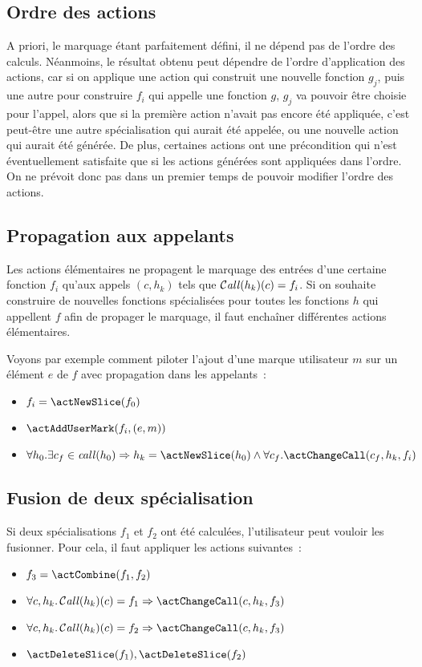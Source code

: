 \subsection{Ordre des actions}\label{sec-ordre}

A priori, le marquage étant parfaitement défini, il ne dépend pas de l'ordre des
calculs. Néanmoins, le résultat obtenu peut dépendre de l'ordre d'application
des actions, car si on applique une action qui construit une nouvelle
fonction $g_j$, puis une autre pour construire $f_i$ qui appelle une fonction
$g$, $g_j$ va pouvoir être choisie pour l'appel, alors que si la première action
n'avait pas encore été appliquée, c'est peut-être une autre spécialisation qui
aurait été appelée, ou une nouvelle action qui aurait été générée.
De plus, certaines actions ont une précondition qui n'est éventuellement
satisfaite que si les actions générées sont appliquées dans l'ordre.
On ne prévoit donc pas dans un premier temps
de pouvoir modifier l'ordre des actions.

\subsection{Propagation aux appelants}\label{sec-propagate-to-calls}

Les actions élémentaires ne propagent le marquage des entrées d'une certaine
fonction $f_i$ qu'aux appels $(c, h_k)$ tels que $\operatorname{\mathcal{C\mathit{all}}}(h_k)(c) = f_i$.
Si on souhaite construire de nouvelles fonctions spécialisées pour toutes les
fonctions $h$ qui appellent $f$ afin de propager le marquage, il faut enchaîner
différentes actions élémentaires.

Voyons par exemple comment piloter l'ajout d'une marque utilisateur $m$ sur un
élément $e$ de $f$ avec propagation dans les appelants~:
\begin{itemize}
  \item $f_i = \actNewSlice (f_0)$
  \item $\actAddUserMark (f_i, (e, m))$
  \item $\forall h_0. \exists c_f \in \call(h_0) 
    \imply h_k = \actNewSlice (h_0) \land \forall c_f. \actChangeCall(c_f, h_k,
    f_i)$
\end{itemize}

\subsection{Fusion de deux spécialisation}\label{sec-fusion}

Si deux spécialisations $f_1$ et $f_2$ ont été calculées, l'utilisateur peut
vouloir les fusionner. Pour cela, il faut appliquer les actions suivantes~:
\begin{itemize}
  \item $f_3 = \actCombine (f_1, f_2)$
  \item $\forall c, h_k. \Call(h_k)(c) = f_1 \imply \actChangeCall(c, h_k, f_3)$
  \item $\forall c, h_k. \Call(h_k)(c) = f_2 \imply \actChangeCall(c, h_k, f_3)$
  \item $\actDeleteSlice(f_1), \actDeleteSlice(f_2)$
\end{itemize}

